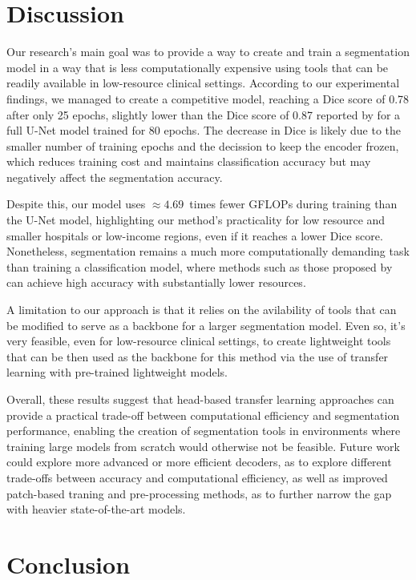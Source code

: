 \documentclass[conference]{IEEEtran}
\begin{document}
\section{Discussion}

Our research's main goal was to provide a way to create and train a segmentation model in a way that is less computationally expensive using tools that can be readily available in low-resource clinical settings. According to our experimental findings, we managed to create a competitive model, reaching a Dice score of 0.78 after only 25 epochs, slightly lower than the Dice score of 0.87 reported by \cite{Pourmahboubi2025} for a full U-Net model trained for 80 epochs. The decrease in Dice is likely due to the smaller number of training epochs and the decission to keep the encoder frozen, which reduces training cost and maintains classification accuracy but may negatively affect the segmentation accuracy.

Despite this, our model uses $\approx 4.69$~times fewer GFLOPs during training than the U-Net model, highlighting our method's practicality for low resource and smaller hospitals or low-income regions, even if it reaches a lower Dice score. Nonetheless, segmentation remains a much more computationally demanding task than training a classification model, where methods such as those proposed by \cite{Gorenshtein2025} can achieve high accuracy with substantially lower resources.

A limitation to our approach is that it relies on the avilability of tools that can be modified to serve as a backbone for a larger segmentation model. Even so, it's very feasible, even for low-resource clinical settings, to create lightweight tools that can be then used as the backbone for this method via the use of transfer learning with pre-trained lightweight models\cite{Gorenshtein2025}.

Overall, these results suggest that head-based transfer learning approaches can provide a practical trade-off between computational efficiency and segmentation performance, enabling the creation of segmentation tools in environments where training large models from scratch would otherwise not be feasible. Future work could explore more advanced or more efficient decoders, as to explore different trade-offs between accuracy and computational efficiency, as well as improved patch-based traning and pre-processing methods, as to further narrow the gap with heavier state-of-the-art models.


\section{Conclusion}
\end{document}
